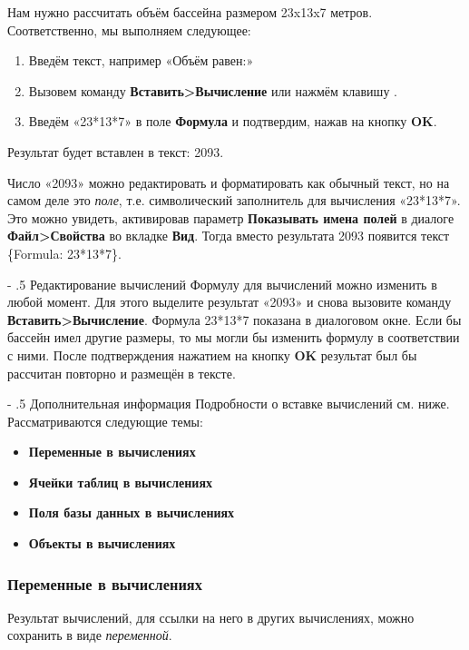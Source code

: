 ﻿\documentclass[a4paper,10pt]{article}
\makeatletter
\renewcommand\paragraph{%
   \@startsection{paragraph}{4}{0mm}%
      {-\baselineskip}%
      {.5\baselineskip}%
      {\normalfont\normalsize\bfseries}}
\makeatother
\begin{document}
Нам нужно рассчитать объём бассейна размером 23x13x7 метров. Соответственно, мы выполняем следующее:

\begin{enumerate}
 \item Введём текст, например «Объём равен:»
 \item Вызовем команду \textbf{Вставить>Вычисление} или нажмём клавишу .
 \item Введём «23*13*7» в поле \textbf{Формула} и подтвердим, нажав на кнопку \textbf{OK}.
\end{enumerate}

Результат будет вставлен в текст: 2093.

Число «2093» можно редактировать и форматировать как обычный текст, но на самом деле это \textit{поле}, т.е. символический заполнитель для вычисления «23*13*7». Это можно увидеть, активировав параметр \textbf{Показывать имена полей} в диалоге \textbf{Файл>Свойства} во вкладке \textbf{Вид}. Тогда вместо результата 2093 появится текст \{Formula: 23*13*7\}.

\paragraph{Редактирование вычислений}
Формулу для вычислений можно изменить в любой момент. Для этого выделите результат «2093» и снова вызовите команду \textbf{Вставить>Вычисление}. Формула 23*13*7 показана в диалоговом окне. Если бы бассейн имел другие размеры, то мы могли бы изменить формулу в соответствии с ними. После подтверждения нажатием на кнопку \textbf{OK} результат был бы рассчитан повторно и размещён в тексте.

\paragraph{Дополнительная информация}
Подробности о вставке вычислений см. ниже. Рассматриваются следующие темы:

\begin{itemize}
 \item \textbf{Переменные в вычислениях}
 \item \textbf{Ячейки таблиц в вычислениях}
 \item \textbf{Поля базы данных в вычислениях}
 \item \textbf{Объекты в вычислениях}
\end{itemize}

\subsubsection{Переменные в вычислениях}
Результат вычислений, для ссылки на него в других вычислениях, можно сохранить в виде \textit{переменной}.
\end{document}
